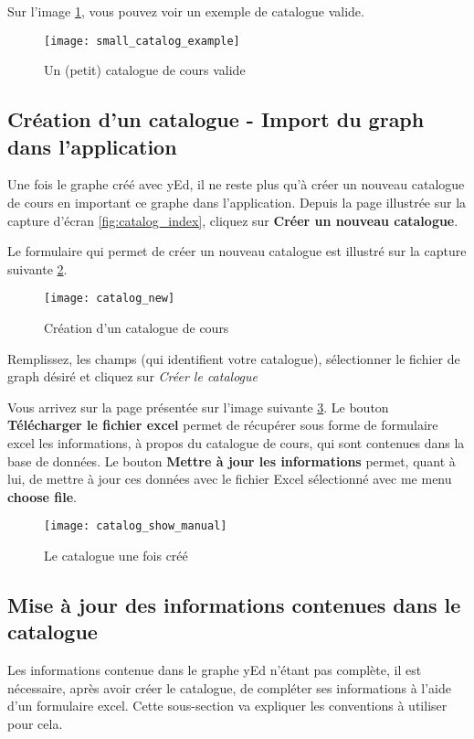 Sur l'image \ref{fig:small_catalog_example}, vous pouvez voir un exemple de catalogue valide.

\begin{figure}[htb]
\centering
\texttt{[image: small\_catalog\_example]}
\label{fig:small_catalog_example}
\caption{Un (petit) catalogue de cours valide}

\end{figure}



\subsection{Création d'un catalogue - Import du graph dans l'application}
Une fois le graphe créé avec yEd, il ne reste plus qu'à créer un nouveau catalogue de cours en important ce graphe dans l'application. Depuis la page illustrée sur la capture d'écran \ref{fig:catalog_index}, cliquez sur \textbf{Créer un nouveau catalogue}.

Le formulaire qui permet de créer un nouveau catalogue est illustré sur la capture suivante \ref{fig:catalog_new}.

\begin{figure}[htb]
\centering
\caption{Création d'un catalogue de cours}
\label{fig:catalog_new}
\texttt{[image: catalog\_new]}
\end{figure}

Remplissez, les champs (qui identifient votre catalogue), sélectionner le fichier de graph désiré et cliquez sur \textit{Créer le catalogue}

Vous arrivez sur la page présentée sur l'image suivante \ref{fig:catalog_show_manual}. Le bouton \textbf{Télécharger le fichier excel} permet de récupérer sous forme de formulaire excel les informations, à propos du catalogue de cours, qui sont contenues dans la base de données. Le bouton \textbf{Mettre à jour les informations} permet, quant à lui, de mettre à jour ces données avec le fichier Excel sélectionné avec me menu \textbf{choose file}.

\begin{figure}[htb]
\centering
\caption{Le catalogue une fois créé}
\label{fig:catalog_show_manual}
\texttt{[image: catalog\_show\_manual]}
\end{figure}

\subsection{Mise à jour des informations contenues dans le catalogue}
Les informations contenue dans le graphe yEd n'étant pas complète, il est nécessaire, après avoir créer le catalogue, de compléter ses informations à l'aide d'un formulaire excel. Cette sous-section va expliquer les conventions à utiliser pour cela.

